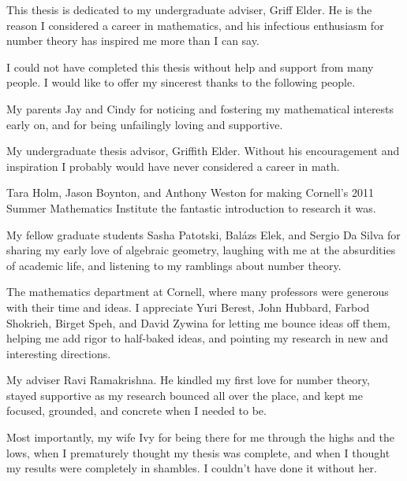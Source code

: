 \documentclass[phd,cornellheadings,tocprelim]{cornell}
\begin{document}
\begin{dedication}
This thesis is dedicated to my undergraduate adviser, Griff Elder. He is the 
reason I considered a career in mathematics, and his infectious enthusiasm 
for number theory has inspired me more than I can say. 
\end{dedication}

\begin{acknowledgements}
I could not have completed this thesis without help and support from many 
people. I would like to offer my sincerest thanks to the following people. 

My parents Jay and Cindy for noticing and fostering my mathematical 
interests early on, and for being unfailingly loving and supportive. 

My undergraduate thesis advisor, Griffith Elder. Without his encouragement 
and inspiration I probably would have never considered a career in math. 

Tara Holm, Jason Boynton, and Anthony Weston for making Cornell's 2011 Summer 
Mathematics Institute the fantastic introduction to research it was. 

My fellow graduate students Sasha Patotski, Bal\'azs Elek, and Sergio Da 
Silva for sharing my early love of algebraic geometry, laughing with me at the 
absurdities of academic life, and listening to my ramblings about number theory. 

The mathematics department at Cornell, where many professors were generous 
with their time and ideas. I appreciate Yuri Berest, John Hubbard, Farbod 
Shokrieh, Birget Speh, and David Zywina for letting me bounce ideas off them, 
helping me add rigor to half-baked ideas, and pointing my research in new and 
interesting directions. 

My adviser Ravi Ramakrishna. He kindled my first love for number theory, 
stayed supportive as my research bounced all over the place, and kept me 
focused, grounded, and concrete when I needed to be. 

Most importantly, my wife Ivy for being there for me through the highs 
and the lows, when I prematurely thought my thesis was complete, and when I 
thought my results were completely in shambles. I couldn't have done it without 
her. 
\end{acknowledgements}

\contentspage
\normalspacing
\setcounter{page}{1}
\pagestyle{cornell}
\addtolength{\parskip}{0.5\baselineskip}
















\printbibliography[heading=bibintoc]
\end{document}
